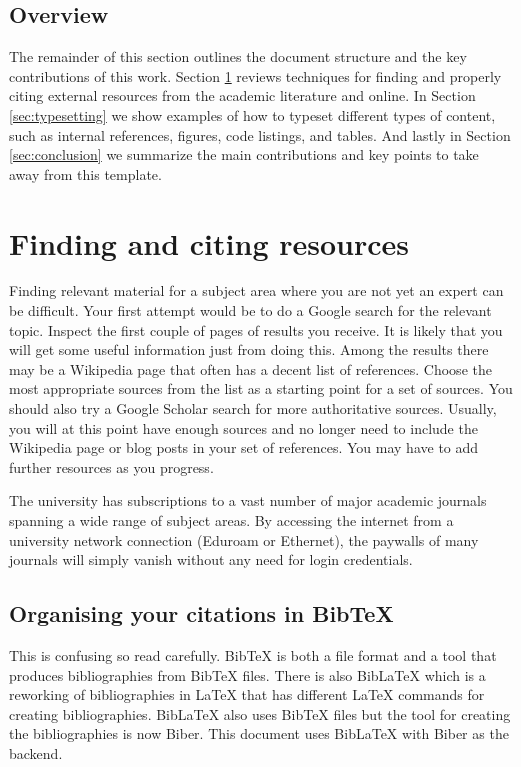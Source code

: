 \documentclass[12pt]{article}
\theoremstyle{plain}
\theoremstyle{definition}
\begin{document}
\subsection{Overview}  
\label{sec:intro_overview} 

The remainder of this section outlines the document structure and the
key contributions of this work. Section \ref{sec:resources} reviews
techniques for finding and properly citing external resources from the
academic literature and online. In Section \ref{sec:typesetting} we
show examples of how to typeset different types of content, such as
internal references, figures, code listings, and tables. And lastly in
Section \ref{sec:conclusion} we summarize the main contributions and
key points to take away from this template.

\section{Finding and citing resources}
\label{sec:resources}

Finding relevant material for a subject area where you are not yet an
expert can be difficult. Your first attempt would be to do a Google
search for the relevant topic. Inspect the first couple of pages of
results you receive. It is likely that you will get some useful
information just from doing this. Among the results there may be a
Wikipedia page that often has a decent list of references. Choose the
most appropriate sources from the list as a starting point for a set
of sources. You should also try a Google Scholar search for more
authoritative sources. Usually, you will at this point have enough
sources and no longer need to include the Wikipedia page or blog posts
in your set of references. You may have to add further resources as
you progress.

The university has subscriptions to a vast number of major academic
journals spanning a wide range of subject areas. By accessing the
internet from a university network connection (Eduroam or Ethernet),
the paywalls of many journals will simply vanish without any need for
login credentials.

\subsection{Organising your citations in BibTeX}
\label{sec:resources_bibtex}

This is confusing so read carefully. BibTeX is both a file format and
a tool that produces bibliographies from BibTeX files. There is also
BibLaTeX which is a reworking of bibliographies in LaTeX that has
different LaTeX commands for creating bibliographies. BibLaTeX also
uses BibTeX files but the tool for creating the bibliographies is now
Biber. This document uses BibLaTeX with Biber as the backend.
\end{document}
